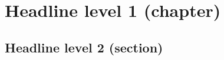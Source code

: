




\chapter{Headline level 1 (chapter)}
\label{chap:HeadlinesLevel}

\section{Headline level 2 (section)}
\vspace{1.5mm} %

